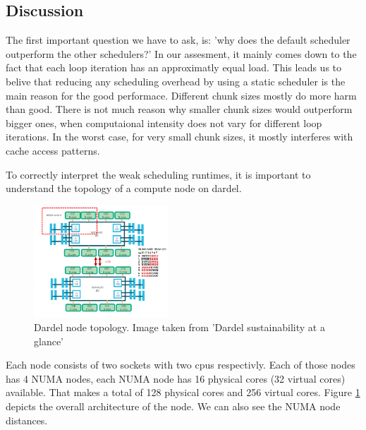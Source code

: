 \documentclass[a4paper,10pt]{article}
\begin{document}
\begin{multicols}{2}
\subsection{Discussion}
The first important question we have to ask, is: 'why does the default scheduler outperform the other schedulers?'
In our assesment, it mainly comes down to the fact that each loop iteration has an approximatly equal load.
This leads us to belive that reducing any scheduling overhead by using a static scheduler is the main reason for the good performace.
Different chunk sizes mostly do more harm than good.
There is not much reason why smaller chunk sizes would outperform bigger ones, when computaional intensity does not vary for different loop iterations.
In the worst case, for very small chunk sizes, it mostly interferes with cache access patterns.

To correctly interpret the weak scheduling runtimes, it is important to understand the topology of a compute node on dardel.
\begin{figure}[H]
     \centering
     \includegraphics[width=0.45\textwidth]{../images/2_openmp/node_topology.png}
     \caption{Dardel node topology. Image taken from 'Dardel sustainability at a glance'\cite{Barth2023}}
     \label{fig:dardel_topo}
\end{figure}
Each node consists of two sockets with two cpus respectivly.
Each of those nodes has 4 NUMA nodes, each NUMA node has 16 physical cores (32 virtual cores) available.
That makes a total of 128 physical cores and 256 virtual cores.
Figure \ref{fig:dardel_topo} depicts the overall architecture of the node.
We can also see the NUMA node distances.


\end{multicols}
\end{document}
